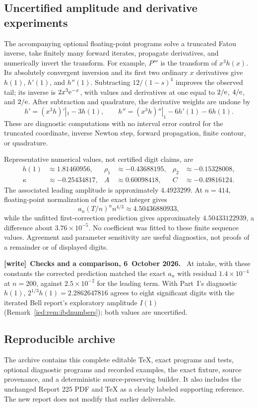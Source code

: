\documentclass[11pt,letterpaper]{article}
\theoremstyle{remark}\newtheorem{remark}[theorem]{Remark}
\newenvironment{writenote}[1][]{\par\smallskip\begingroup\small
 \noindent\textbf{[write]}\if\relax\detokenize{#1}\relax\else~\textbf{#1.}\fi\ }%
 {\par\endgroup\smallskip}
\begin{document}
\subsection{Uncertified amplitude and derivative experiments}\label{ied:corr:sub:diagnostics}
The accompanying optional floating-point programs solve a truncated Fatou inverse, take finitely many forward iterates, propagate derivatives, and numerically invert the transform. For example, $P'''$ is the transform of $x^3h(x)$. Its absolutely convergent inversion and its first two ordinary $x$ derivatives give $h(1)$, $h'(1)$, and $h''(1)$. Subtracting $12/(1-s)^4$ improves the observed tail; its inverse is $2x^3\mathrm e^{-x}$, with values and derivatives at one equal to $2/\mathrm e$, $4/\mathrm e$, and $2/\mathrm e$. After subtraction and quadrature, the derivative weights are undone by
\[
 h'= (x^3h)'|_1-3h(1),\qquad
 h''=(x^3h)''|_1-6h'(1)-6h(1).
\]
These are diagnostic computations with no interval error control for the truncated coordinate, inverse Newton step, forward propagation, finite contour, or quadrature.

Representative numerical values, not certified digit claims, are
\begin{align*}
 h(1)&\approx1.81460956,& \rho_1&\approx-0.43688195,&
 \rho_2&\approx-0.15328008,\\
 \kappa&\approx-0.25434817,& A&\approx0.60098418,&
 C&\approx-0.49816124.
\end{align*}
The associated leading amplitude is approximately $4.4923299$. At $n=414$, floating-point normalization of the exact integer gives
\[
 a_n(T/n)^n n^{4/3}\approx4.50436880933,
\]
while the unfitted first-correction prediction gives approximately $4.50433122939$, a difference about $3.76\times10^{-5}$. No coefficient was fitted to these finite sequence values. Agreement and parameter sensitivity are useful diagnostics, not proofs of a remainder or of displayed digits.

\begin{writenote}[Checks and a comparison, 6~October 2026]
At intake, with these constants the corrected prediction matched the exact $a_n$ with residual $1.4\times10^{-4}$ at $n=200$, against $2.5\times10^{-2}$ for the leading term. With Part~I's diagnostic $h(1)$, $2^{1/3}h(1)=2.2862647816$ agrees to eight significant digits with the iterated Bell report's exploratory amplitude $I(1)$ (Remark~\ref{ied:rem:ibdnumbers}); both values are uncertified.
\end{writenote}

\subsection{Reproducible archive}
The archive contains this complete editable TeX, exact programs and tests, optional diagnostic programs and recorded examples, the exact fixture, source provenance, and a deterministic source-preserving builder. It also includes the unchanged Report 225 PDF and TeX as a clearly labeled supporting reference. The new report does not modify that earlier deliverable.
\end{document}
